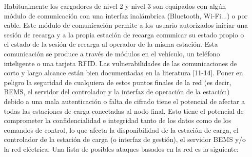 \documentclass[12pt,a4paper,onecolumn,oneside]{report}
\begin{document}
Habitualmente los cargadores de nivel 2 y nivel 3 son equipados con algún módulo de comunicación con una interfaz inalámbrica (Bluetooth, Wi-Fi...) o por cable. Este módulo de comunicación permite a los usuario autorizados iniciar una sesión de recarga y a la propia estación de recarga comunicar su estado propio o el estado de la sesión de recarga al operador de la misma estación. Esta comunicación se produce a través de módulos en el vehículo, un teléfono inteligente o una tarjeta RFID. Las vulnerabilidades de las comunicaciones de corto y largo alcance están bien documentadas en la literatura [11-14]. Poner en peligro la seguridad de cualquiera de estos puntos finales de la red (es decir, BEMS, el servidor del controlador y la interfaz de operación de la estación) debido a una mala autenticación o falta de cifrado tiene el potencial de afectar a todas las estaciones de carga conectadas al nodo final. Esto tiene el potencial de comprometer la confidencialidad e integridad tanto de los datos como de los comandos de control, lo que afecta la disponibilidad de la estación de carga, el controlador de la estación de carga (o interfaz de gestión), el servidor BEMS y/o la red eléctrica. 
Una lista de posibles ataques basados en la red es la siguiente:
\end{document}
